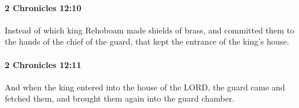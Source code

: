		\paragraph{2 Chronicles 12:10} %
			\label{2CHRONICLES-12-10}

			Instead of which king Rehoboam made shields of brass, and committed them to the hands of the chief of the guard, that kept the entrance of the king's house.


		\paragraph{2 Chronicles 12:11} %
			\label{2CHRONICLES-12-11}

			And when the king entered into the house of the LORD, the guard came and fetched them, and brought them again into the guard chamber.


